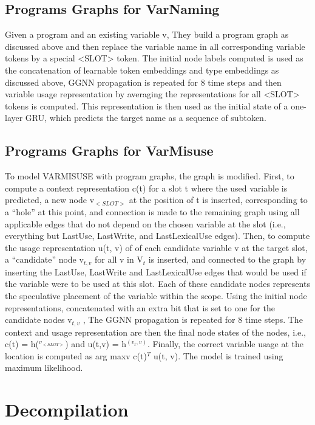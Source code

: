 \documentclass{article}
\begin{document}
\subsection{Programs Graphs for VarNaming}
Given a program and an existing variable v, They build a program graph as discussed above and then replace the variable name in all corresponding variable tokens by a special <SLOT> token. The initial node labels computed is used as the concatenation of learnable token embeddings and type embeddings as discussed above, GGNN propagation is repeated for 8 time steps and then variable usage representation by averaging the representations for all <SLOT> tokens is computed. This representation is then used as the initial state of a one-layer GRU, which predicts the target name as a sequence of subtoken.

\subsection{Programs Graphs for VarMisuse}
To model VARMISUSE with program graphs, the graph is modified. First, to compute a context representation c(t) for a slot t where the used variable is predicted, a new node v$_{<SLOT>}$ at the position of t is inserted, corresponding to a “hole” at this point, and connection is made to the remaining graph using all applicable edges that do not depend on the chosen variable at the slot (i.e., everything but LastUse, LastWrite, and LastLexicalUse edges). Then, to compute the usage representation u(t, v) of of each candidate variable v at the target slot, a “candidate” node v$_{t,v}$ for all v in V$_t$ is inserted, and connected to the graph by inserting the LastUse, LastWrite and LastLexicalUse edges that would be used if the variable were to be used at this slot. Each of these candidate nodes represents the speculative placement of the variable within the scope.
Using the initial node representations, concatenated with an extra bit that is set to one for the candidate nodes v$_{t,v}$ , The GGNN propagation is repeated for 8 time steps. The context and usage representation are then the final node states of the nodes, i.e., c(t) = h($^{v_{<SLOT>}}$) and u(t,v) = h$^{(v_t,v)}$. Finally, the correct variable usage at the location is computed as arg maxv c(t)$^T$ u(t, v). The model is trained using maximum likelihood.



\section{Decompilation}
\label{decompilation}
\end{document}

